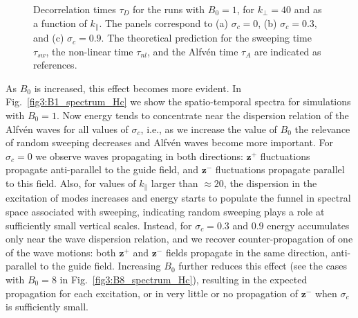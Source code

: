 \documentclass[aip,pop,reprint,amsmath,amssymb,floatfix]{revtex4-1}
\renewcommand{\vec}[1]{\mathbf{#1}}
\begin{document}
\begin{figure}
    \caption{Decorrelation times $\tau_D$ for the runs with $B_0=1$,
      for $k_\perp=40$ and as a function of $k_\parallel$. The panels
      correspond to (a) $\sigma_c = 0$, (b) $\sigma_c = 0.3$, and (c)
      $\sigma_c = 0.9$. The theoretical prediction for the sweeping
      time $\tau_{sw}$, the non-linear time $\tau_{nl}$, and the
      Alfv\'en time $\tau_A$ are indicated as references.}
  \label{fig5:tD_vs_Hc}
\end{figure}

As $B_0$ is increased, this effect becomes more evident. In
Fig.~\ref{fig3:B1_spectrum_Hc} we show the spatio-temporal spectra for
simulations with $B_0=1$. Now energy tends to concentrate near the
dispersion relation of the Alfv\'en waves for all values of
$\sigma_c$, i.e., as we increase the value of $B_0$ the relevance of
random sweeping decreases and Alfv\'en waves become more
important. For $\sigma_c=0$ we observe waves propagating in both
directions: $\vec{z}^+$ fluctuations propagate anti-parallel to the
guide field, and $\vec{z}^-$ fluctuations propagate parallel to this
field. Also, for values of $k_\parallel$ larger than $\approx 20$, the
dispersion in the excitation of modes increases and energy starts to
populate the funnel in spectral space associated with sweeping,
indicating random sweeping plays a role at sufficiently small vertical
scales. Instead, for $\sigma_c =0.3$ and $0.9$ energy accumulates only
near the wave dispersion relation, and we recover counter-propagation
of one of the wave motions: both $\vec{z}^+$ and $\vec{z}^-$ fields
propagate in the same direction, anti-parallel to the guide
field. Increasing $B_0$ further reduces this effect (see the cases
with $B_0=8$ in Fig.~\ref{fig3:B8_spectrum_Hc}), resulting in the
expected propagation for each excitation, or in very little or no
propagation of $\vec{z}^-$ when $\sigma_c$ is sufficiently small.
\end{document}
